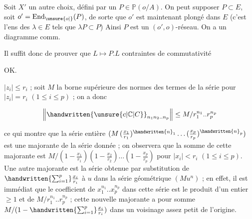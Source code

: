 
 Soit $X'$ un autre choix, défini par un $P\in\mathbb P(o/A)$. On peut supposer $P\subset E$, soit $o'=\mathrm{End}_{\unsure{o|{}}}(P)$, de sorte que $o'$ est maintenant plongé dans $E$ (c'est l'ens des  $\lambda\in E$ tels que $\lambda P\subset P$) Ainsi $P$ est un  $(o',o)$-réseau. On a un diagramme comm.


Il suffit donc de prouver que $L\longmapsto P.L$     contraintes de commutativité


OK.


$|z_i|\leq r_i$ ; soit $M$ la borne supérieure des normes des termes de la série pour $|z_i|=r_i$ $(1\leq i\leq p)$ ; on a donc

\[
\left\|\handwritten{\unsure{c|\mathbb C|C}}_{n_1n_2..n_p}\right\|\leq M/r_1^{n_1}..r_p^{n_p}
\]

ce qui montre que la série entière $(M\,(\frac{x_1}{r_1})^{\handwritten{n}_1}\ldots(\frac{x_p}{r_p})^{\handwritten{n}_p})$ est une majorante de la série donnée ; on observera que la somme de cette majorante est $M/(1-\frac{x_1}{r_1})(1-\frac{x_2}{r_2})\ldots(1-\frac{x_p}{r_p})$ pour $|x_i|<r_i$ $(1\leq i\leq p)$. Une autre majorante est la série obtenue par substitution de $\handwritten{\sum_{i=1}^p}\frac{x_i}{r_i}$ à $u$ dans la série géométrique $(Mu^n)$ ; en effet, il est immédiat que le coefficient de $x_1^{n_1}..x_p^{n_p}$ dans cette série est le produit d'un entier $\geq1$ et de $M/r_1^{n_1}..r_p^{n_p}$ ; cette nouvelle majorante a pour somme $M/(1-\handwritten{\sum_{i=1}^p}\frac{x_i}{r_i})$ dans un voisinage assez petit de l'origine.

